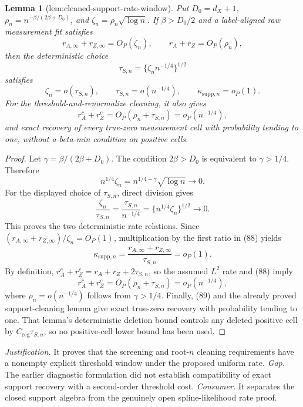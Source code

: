 \documentclass{article}
\newtheorem{lemma}{Lemma}
\begin{document}
\begin{lemma}[lem:cleaned-support-rate-window]\label{lem:cleaned-support-rate-window}
Put \(D_0=d_X+1\), \(\rho_n=n^{-\beta/(2\beta+D_0)}\), and \(\zeta_n=\rho_n\sqrt{\log n}\).  If \(\beta>D_0/2\) and a label-aligned raw measurement fit satisfies
\[
 r_{A,\infty}+r_{Z,\infty}=O_P(\zeta_n),
 \qquad r_A+r_Z=O_P(\rho_n),
\]
then the deterministic choice
\[
 \tau_{S,n}=\{\zeta_n n^{-1/4}\}^{1/2}
\]
satisfies
\[
 \zeta_n=o(\tau_{S,n}),
 \qquad \tau_{S,n}=o(n^{-1/4}),
 \qquad \kappa_{\mathrm{supp},n}=o_P(1).
\]
For the threshold-and-renormalize cleaning, it also gives
\[
 r_A^c+r_Z^c=O_P(\rho_n+\tau_{S,n})=o_P(n^{-1/4}),
\]
and exact recovery of every true-zero measurement cell with probability tending to one, without a beta-min condition on positive cells.
\end{lemma}
\begin{proof}
Let \(\gamma=\beta/(2\beta+D_0)\).  The condition \(2\beta>D_0\) is equivalent to \(\gamma>1/4\).  Therefore
\[
 n^{1/4}\zeta_n=n^{1/4-\gamma}\sqrt{\log n}\longrightarrow0.  \tag{87}
\]
For the displayed choice of \(\tau_{S,n}\), direct division gives
\[
 \frac{\zeta_n}{\tau_{S,n}}
 =\frac{\tau_{S,n}}{n^{-1/4}}
 =\{n^{1/4}\zeta_n\}^{1/2}\longrightarrow0.                   \tag{88}
\]
This proves the two deterministic rate relations.  Since
\((r_{A,\infty}+r_{Z,\infty})/\zeta_n=O_P(1)\), multiplication by the first ratio in (88) yields
\[
 \kappa_{\mathrm{supp},n}
 =\frac{r_{A,\infty}+r_{Z,\infty}}{\tau_{S,n}}=o_P(1).         \tag{89}
\]
By definition, \(r_A^c+r_Z^c=r_A+r_Z+2\tau_{S,n}\), so the assumed \(L^2\) rate and (88) imply
\[
 r_A^c+r_Z^c=O_P(\rho_n+\tau_{S,n})=o_P(n^{-1/4}),              \tag{90}
\]
where \(\rho_n=o(n^{-1/4})\) follows from \(\gamma>1/4\).  Finally, (89) and the already proved support-cleaning lemma give exact true-zero recovery with probability tending to one.  That lemma's deterministic deletion bound controls any deleted positive cell by \(C_{\mathrm{reg}}\tau_{S,n}\), so no positive-cell lower bound has been used.
\end{proof}
\par\smallskip\noindent \textit{Justification.} It proves that the screening and root-\(n\) cleaning requirements have a nonempty explicit threshold window under the proposed uniform rate. \textit{Gap.} The earlier diagnostic formulation did not establish compatibility of exact support recovery with a second-order threshold cost. \textit{Consumer.} It separates the closed support algebra from the genuinely open spline-likelihood rate proof.
\end{document}
